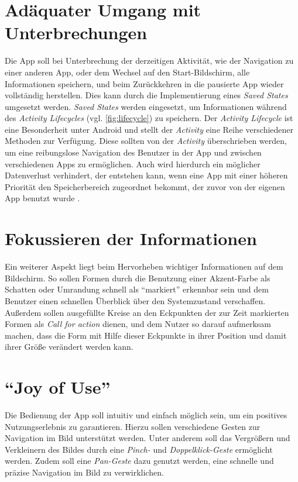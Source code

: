 \section{Adäquater Umgang mit Unterbrechungen}
Die App soll bei Unterbrechung der derzeitigen Aktivität, wie der Navigation zu einer anderen App, oder dem Wechsel auf den Start-Bildschirm, alle Informationen speichern, und beim Zurückkehren in die pausierte App wieder vollständig herstellen.
Dies kann durch die Implementierung eines \emph{Saved States} umgesetzt werden.
\emph{Saved States} werden eingesetzt, um Informationen während des \emph{Activity Lifecycles} (vgl. \autoref{fig:lifecycle}) zu speichern.
Der \emph{Activity Lifecycle} ist eine Besonderheit unter Android und stellt der \emph{Activity} eine Reihe verschiedener Methoden zur Verfügung.
Diese sollten von der \emph{Activity} überschrieben werden, um eine reibungslose Navigation des Benutzer in der App und zwischen verschiedenen Apps zu ermöglichen.
Auch wird hierdurch ein möglicher Datenverlust verhindert, der entstehen kann, wenn eine App mit einer höheren Priorität den Speicherbereich zugeordnet bekommt, der zuvor von der eigenen App benutzt wurde \citep{alifecycle}.

\section{Fokussieren der Informationen}
Ein weiterer Aspekt liegt beim Hervorheben wichtiger Informationen auf dem Bildschirm.
So sollen Formen durch die Benutzung einer Akzent-Farbe als Schatten oder Umrandung schnell als ``markiert'' erkennbar sein und dem Benutzer einen schnellen Überblick über den Systemzustand verschaffen.
Außerdem sollen ausgefüllte Kreise an den Eckpunkten der zur Zeit markierten Formen als \emph{Call for action} dienen, und dem Nutzer so darauf aufmerksam machen, dass die Form mit Hilfe dieser Eckpunkte in ihrer Position und damit ihrer Größe verändert werden kann.

\section{``Joy of Use''}
Die Bedienung der App soll intuitiv und einfach möglich sein, um ein positives Nutzungserlebnis zu garantieren.
Hierzu sollen verschiedene Gesten zur Navigation im Bild unterstützt werden.
Unter anderem soll das Vergrößern und Verkleinern des Bildes durch eine \emph{Pinch-} und \emph{Doppelklick-Geste} ermöglicht werden.
Zudem soll eine \emph{Pan-Geste} dazu genutzt werden, eine schnelle und präzise Navigation im Bild zu verwirklichen.

